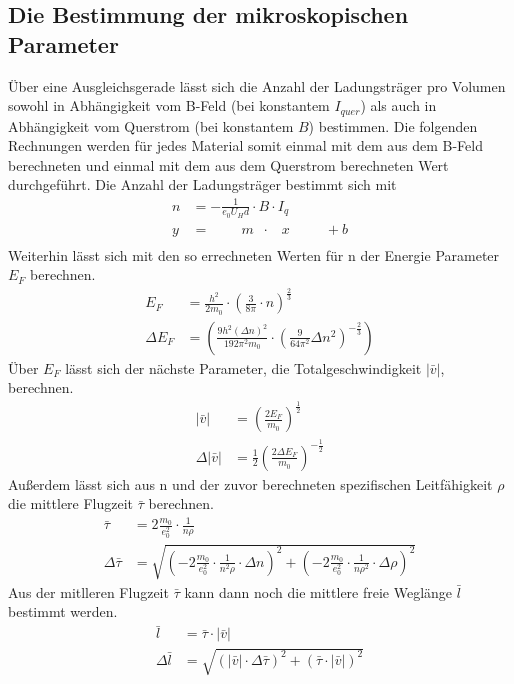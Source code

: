 \subsection{Die Bestimmung der mikroskopischen Parameter}
\label{subsubsec:mikro_Param}
Über eine Ausgleichsgerade lässt sich die Anzahl der Ladungsträger pro Volumen sowohl in Abhängigkeit vom B-Feld (bei konstantem $I_{quer}$) als auch in Abhängigkeit vom Querstrom (bei konstantem $B$) bestimmen.
Die folgenden Rechnungen werden für jedes Material somit einmal mit dem aus dem B-Feld berechneten und einmal mit dem aus dem Querstrom berechneten Wert durchgeführt.
Die Anzahl der Ladungsträger bestimmt sich mit
\begin{align*}
    n &= -\frac{1}{e_0 U_H d}\cdot B\cdot I_q \\
    y &= \;\;\; \; \; \; \; \;   m \;  \; \cdot \; \; \; x \; \; \; \; \; \; \; \; \; +b\\
\end{align*}
Weiterhin lässt sich mit den so errechneten Werten für n der Energie Parameter $E_F$ berechnen.
\begin{align*}
    E_F &= \frac{h^2}{2 m_0}\cdot \left(\frac{3}{8\pi}\cdot n \right)^{\frac{2}{3}} \\
    \Delta E_F &= \left( \frac{9 h^2  \left(\Delta n\right)^2}{192 \pi^2 m_0} \cdot \left( \frac{9}{64\pi^2} \Delta n^2\right)^{-\frac{2}{3}}  \right)
\end{align*}
Über $E_F$ lässt sich der nächste Parameter, die Totalgeschwindigkeit $|\bar{v}|$, berechnen.
\begin{align*}
    |\bar{v}| &= \left(\frac{2 E_F}{m_0}\right)^{\frac{1}{2}} \\
    \Delta |\bar{v}| &= \frac{1}{2} \left(\frac{2 \Delta E_F}{m_0}\right)^{-\frac{1}{2}}
\end{align*}
Außerdem lässt sich aus n und der zuvor berechneten spezifischen Leitfähigkeit $\rho$ die mittlere Flugzeit $\bar{\tau}$ berechnen.
\begin{align*}
    \bar{\tau} &= 2 \frac{m_0}{e_0^2} \cdot \frac{1}{n \rho} \\
    \Delta \bar{\tau} &= \sqrt{ \left( -2 \frac{m_0}{e_0^2} \cdot \frac{1}{n^2 \rho} \cdot \Delta n \right)^2 + \left( -2 \frac{m_0}{e_0^2} \cdot \frac{1}{n \rho^2} \cdot \Delta \rho \right)^2 }
\end{align*}
Aus der mitlleren Flugzeit $\bar{\tau}$ kann dann noch die mittlere freie Weglänge $\bar{l}$ bestimmt werden.
\begin{align*}
    \bar{l} &= \bar{\tau} \cdot |\bar{v}| \\
    \Delta \bar{l} &= \sqrt{\left(|\bar{v}|\cdot\Delta\bar{\tau}\right)^2+\left(\bar{\tau}\cdot|\bar{v}|\right)^2}
\end{align*}
